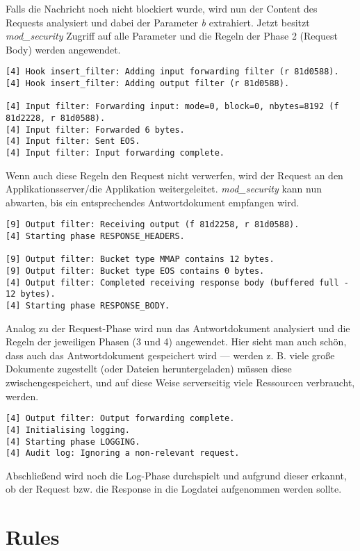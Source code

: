 Falls die Nachricht noch nicht blockiert wurde, wird nun der Content des Requests analysiert und dabei der Parameter \textit{b} extrahiert. Jetzt besitzt \textit{mod\_security} Zugriff auf alle Parameter und die Regeln der Phase 2 (Request Body) werden angewendet.

\begin{verbatim}
[4] Hook insert_filter: Adding input forwarding filter (r 81d0588).
[4] Hook insert_filter: Adding output filter (r 81d0588).

[4] Input filter: Forwarding input: mode=0, block=0, nbytes=8192 (f 81d2228, r 81d0588).
[4] Input filter: Forwarded 6 bytes.
[4] Input filter: Sent EOS.
[4] Input filter: Input forwarding complete.
\end{verbatim}

Wenn auch diese Regeln den Request nicht verwerfen, wird der Request an den Applikationsserver/die Applikation weitergeleitet. \textit{mod\_security} kann nun abwarten, bis ein entsprechendes Antwortdokument empfangen wird.

\begin{verbatim}
[9] Output filter: Receiving output (f 81d2258, r 81d0588).
[4] Starting phase RESPONSE_HEADERS.

[9] Output filter: Bucket type MMAP contains 12 bytes.
[9] Output filter: Bucket type EOS contains 0 bytes.
[4] Output filter: Completed receiving response body (buffered full - 12 bytes).
[4] Starting phase RESPONSE_BODY.
\end{verbatim}

Analog zu der Request-Phase wird nun das Antwortdokument analysiert und die Regeln der jeweiligen Phasen (3 und 4) angewendet. Hier sieht man auch schön, dass auch das Antwortdokument gespeichert wird --- werden z. B. viele große Dokumente zugestellt (oder Dateien heruntergeladen) müssen diese zwischengespeichert, und auf diese Weise serverseitig viele Ressourcen verbraucht, werden.

\begin{verbatim}
[4] Output filter: Output forwarding complete.
[4] Initialising logging.
[4] Starting phase LOGGING.
[4] Audit log: Ignoring a non-relevant request.
\end{verbatim}

Abschließend wird noch die Log-Phase durchspielt und aufgrund dieser erkannt, ob der Request bzw. die Response in die Logdatei aufgenommen werden sollte.

\section{Rules}

